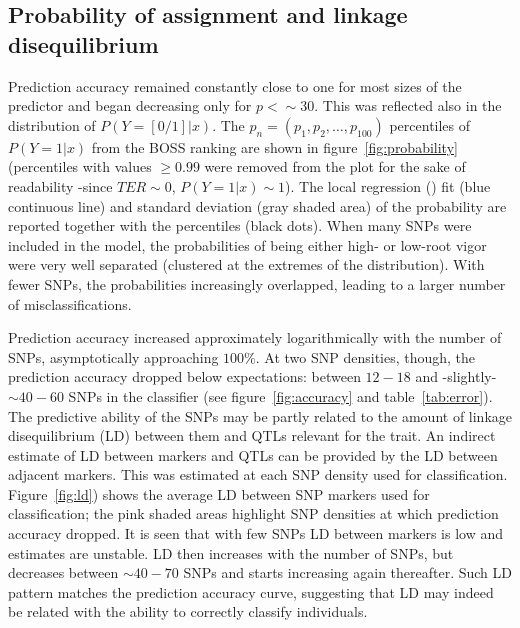 \subsection{Probability of assignment and linkage disequilibrium}
\label{par:probability}
Prediction accuracy remained constantly close to one for most sizes of
the predictor and began decreasing only for $p < \sim 30$. This was
reflected also in the distribution of $P(Y=[0/1]|x)$. The $p_n=(p_1,p_2,
\ldots, p_{100})$ percentiles of $P(Y=1|x)$ from the BOSS ranking are shown in figure~\ref{fig:probability}
(percentiles with values $\geq 0.99$ were removed from the plot for the
sake of readability -since $TER \sim 0$, $P(Y=1|x) \sim 1$). The local
regression (\cite{james2013moving}) fit (blue continuous line) and standard deviation (gray shaded area)
of the probability are reported together with the percentiles (black dots). When many SNPs
were included in the model, the probabilities of being either high- or
low-root vigor were very well separated (clustered at the extremes of
the distribution). With fewer SNPs, the probabilities increasingly
overlapped, leading to a larger number of misclassifications. 

Prediction accuracy increased approximately logarithmically with the
number of SNPs, asymptotically approaching $100\%$. 
At two SNP densities, though, the prediction accuracy dropped below
expectations: between $12-18$ and -slightly- $\sim 40-60$ SNPs in the
classifier (see figure~\ref{fig:accuracy} and table~\ref{tab:error}). 
The predictive ability of the SNPs may be partly related to the amount
of linkage disequilibrium (LD) between them and QTLs relevant for the trait. 
An indirect estimate of LD between markers and QTLs can be provided by
the LD between adjacent markers. This was estimated at each SNP density used for
classification. Figure~\ref{fig:ld}) shows the average LD between SNP
markers used for classification; the pink shaded areas highlight
SNP densities at which prediction accuracy dropped.
It is seen that with few SNPs LD between markers is low and estimates
are unstable. LD then increases with the number of SNPs, but decreases
between $\sim 40-70$ SNPs and starts increasing again thereafter. Such
LD pattern matches the prediction accuracy curve, suggesting that LD may
indeed be related with the ability to correctly classify individuals.

